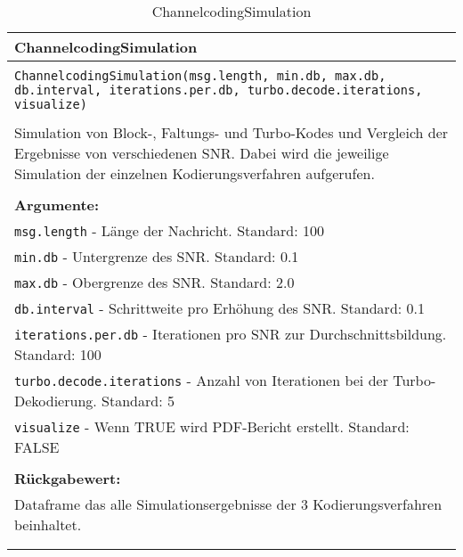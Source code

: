\begin{longtable}{|p{\textwidth}|}
\hline
\rowcolor{lightblue}
ChannelcodingSimulation\\
\hline
\\
\texttt{ChannelcodingSimulation(msg.length, min.db, max.db, db.interval, iterations.per.db, turbo.decode.iterations, visualize)}\\
\\
Simulation von Block-, Faltungs- und Turbo-Kodes und Vergleich der Ergebnisse von verschiedenen SNR. Dabei wird die jeweilige Simulation der einzelnen Kodierungsverfahren aufgerufen.\\
\\
\textbf{Argumente:}\\
\texttt{msg.length} - Länge der Nachricht. Standard: 100\\
\texttt{min.db} - Untergrenze des SNR. Standard: 0.1\\
\texttt{max.db} - Obergrenze des SNR. Standard: 2.0\\
\texttt{db.interval} - Schrittweite pro Erhöhung des SNR. Standard: 0.1\\
\texttt{iterations.per.db} - Iterationen pro SNR zur Durchschnittsbildung. Standard: 100\\
\texttt{turbo.decode.iterations} - Anzahl von Iterationen bei der Turbo-Dekodierung. Standard: 5\\
\texttt{visualize} - Wenn TRUE wird PDF-Bericht erstellt. Standard: FALSE\\
\\
\textbf{Rückgabewert:}\\
Dataframe das alle Simulationsergebnisse der 3 Kodierungsverfahren beinhaltet.\\
\\
\hline
\caption{ChannelcodingSimulation}
\end{longtable}